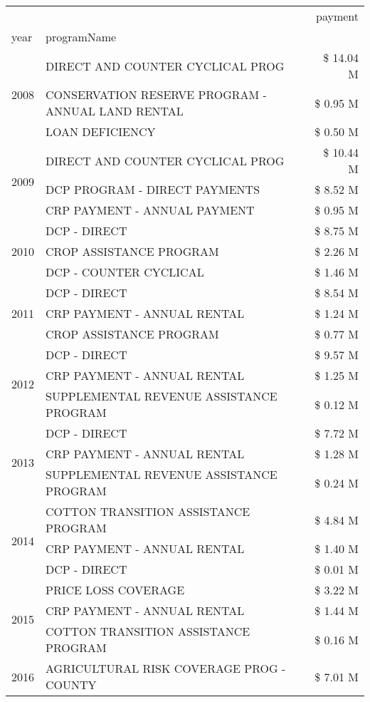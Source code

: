 \begin{tabular}{llr}
\toprule
 &  & payment \\
year & programName &  \\
\midrule
\multirow[t]{3}{*}{2008} & DIRECT AND COUNTER CYCLICAL PROG & \$ 14.04 M \\
 & CONSERVATION RESERVE PROGRAM - ANNUAL LAND RENTAL & \$ 0.95 M \\
 & LOAN DEFICIENCY & \$ 0.50 M \\
\cline{1-3}
\multirow[t]{3}{*}{2009} & DIRECT AND COUNTER CYCLICAL PROG & \$ 10.44 M \\
 & DCP PROGRAM - DIRECT PAYMENTS & \$ 8.52 M \\
 & CRP PAYMENT - ANNUAL PAYMENT & \$ 0.95 M \\
\cline{1-3}
\multirow[t]{3}{*}{2010} & DCP - DIRECT & \$ 8.75 M \\
 & CROP ASSISTANCE PROGRAM & \$ 2.26 M \\
 & DCP - COUNTER CYCLICAL & \$ 1.46 M \\
\cline{1-3}
\multirow[t]{3}{*}{2011} & DCP - DIRECT & \$ 8.54 M \\
 & CRP PAYMENT - ANNUAL RENTAL & \$ 1.24 M \\
 & CROP ASSISTANCE PROGRAM & \$ 0.77 M \\
\cline{1-3}
\multirow[t]{3}{*}{2012} & DCP - DIRECT & \$ 9.57 M \\
 & CRP PAYMENT - ANNUAL RENTAL & \$ 1.25 M \\
 & SUPPLEMENTAL REVENUE ASSISTANCE PROGRAM & \$ 0.12 M \\
\cline{1-3}
\multirow[t]{3}{*}{2013} & DCP - DIRECT & \$ 7.72 M \\
 & CRP PAYMENT - ANNUAL RENTAL & \$ 1.28 M \\
 & SUPPLEMENTAL REVENUE ASSISTANCE PROGRAM & \$ 0.24 M \\
\cline{1-3}
\multirow[t]{3}{*}{2014} & COTTON TRANSITION ASSISTANCE PROGRAM & \$ 4.84 M \\
 & CRP PAYMENT - ANNUAL RENTAL & \$ 1.40 M \\
 & DCP - DIRECT & \$ 0.01 M \\
\cline{1-3}
\multirow[t]{3}{*}{2015} & PRICE LOSS COVERAGE & \$ 3.22 M \\
 & CRP PAYMENT - ANNUAL RENTAL & \$ 1.44 M \\
 & COTTON TRANSITION ASSISTANCE PROGRAM & \$ 0.16 M \\
\cline{1-3}
\multirow[t]{3}{*}{2016} & AGRICULTURAL RISK COVERAGE PROG - COUNTY & \$ 7.01 M \\

\end{tabular}
